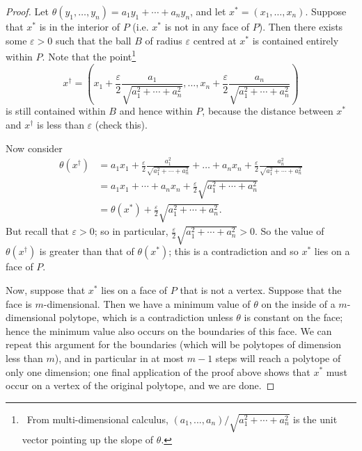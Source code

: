 \documentclass[a4paper,leqno]{article}
\numberwithin{equation}{section}
\theoremstyle{definition}
\theoremstyle{remark}
\begin{document}
\begin{proof}
  Let $ \theta(y_1, \dots, y_n) = a_1 y_1 + \cdots + a_n y_n $, and let $ x^* = (x_1, \dots, x_n ) $. Suppose that $ x^* $ is in the interior
  of $ P $ (i.e. $ x^* $ is not in any face of $ P $). Then there exists some $ \varepsilon > 0 $ such that the ball $ B $ of radius $ \varepsilon $ centred
  at $ x^* $ is contained entirely within $ P $. Note that the point\footnote{~From multi-dimensional calculus, $ (a_1, ..., a_n)/\sqrt{a_1^2 + \cdots + a_n^2} $
  is the unit vector pointing up the slope of $ \theta $.}
  \begin{displaymath}
    x^\dagger = (x_1 + \frac{\varepsilon}{2} \frac{a_1}{\sqrt{a_1^2 + \cdots + a_n^2}}, \dots, x_n + \frac{\varepsilon}{2} \frac{a_n}{\sqrt{a_1^2 + \cdots + a_n^2}})
  \end{displaymath}
  is still contained within $ B $ and hence within $ P $, because the distance between $ x^* $ and $ x^\dagger $ is less than $ \varepsilon $ (check this).

  Now consider
  \begin{align*}
    \theta(x^\dagger) &= a_1 x_1 + \frac{\varepsilon}{2} \frac{a_1^2}{\sqrt{a_1^2 + \cdots + a_n^2}} + \dots
                       + a_n x_n + \frac{\varepsilon}{2} \frac{a_n^2}{\sqrt{a_1^2 + \cdots + a_n^2}}\\
                      &= a_1 x_1 + \cdots + a_n x_n + \frac{\varepsilon}{2} \sqrt{a_1^2 + \cdots + a_n^2}\\
                      &= \theta(x^*) + \frac{\varepsilon}{2} \sqrt{a_1^2 + \cdots + a_n^2}.
  \end{align*}
  But recall that $ \varepsilon > 0 $; so in particular, $ \frac{\varepsilon}{2} \sqrt{a_1^2 + \cdots + a_n^2} > 0 $. So the value of $ \theta(x^\dagger) $ is
  greater than that of $ \theta(x^*) $; this is a contradiction and so $ x^* $ lies on a face of $ P $.

  Now, suppose that $ x^* $ lies on a face of $ P $ that is not a vertex. Suppose that the face is $ m$-dimensional. Then we have a minimum value of $ \theta $ on
  the inside of a $ m$-dimensional polytope, which is a contradiction unless $ \theta $ is constant on the face; hence the minimum value also occurs on the boundaries
  of this face. We can repeat this argument for the boundaries (which will be polytopes of dimension less than $ m $), and in particular in at most $ m-1 $ steps
  will reach a polytope of only one dimension; one final application of the proof above shows that $ x^* $ must occur on a vertex of the original polytope, and we
  are done.
\end{proof}
\end{document}
